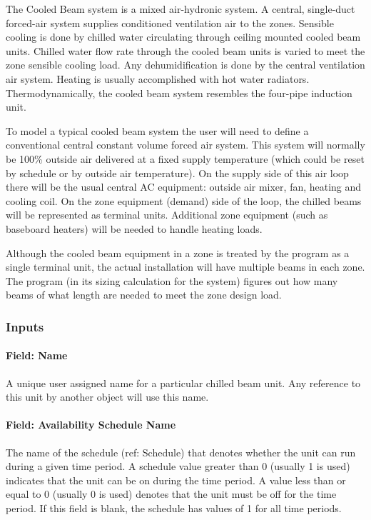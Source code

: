 The Cooled Beam system is a mixed air-hydronic system. A central, single-duct forced-air system supplies conditioned ventilation air to the zones. Sensible cooling is done by chilled water circulating through ceiling mounted cooled beam units. Chilled water flow rate through the cooled beam units is varied to meet the zone sensible cooling load. Any dehumidification is done by the central ventilation air system. Heating is usually accomplished with hot water radiators. Thermodynamically, the cooled beam system resembles the four-pipe induction unit.

To model a typical cooled beam system the user will need to define a conventional central constant volume forced air system. This system will normally be 100\% outside air delivered at a fixed supply temperature (which could be reset by schedule or by outside air temperature). On the supply side of this air loop there will be the usual central AC equipment: outside air mixer, fan, heating and cooling coil. On the zone equipment (demand) side of the loop, the chilled beams will be represented as terminal units. Additional zone equipment (such as baseboard heaters) will be needed to handle heating loads.

Although the cooled beam equipment in a zone is treated by the program as a single terminal unit, the actual installation will have multiple beams in each zone. The program (in its sizing calculation for the system) figures out how many beams of what length are needed to meet the zone design load.

\subsubsection{Inputs}\label{inputs-11-000}

\paragraph{Field: Name}\label{field-name-11-000}

A unique user assigned name for a particular chilled beam unit. Any reference to this unit by another object will use this name.

\paragraph{Field: Availability Schedule Name}\label{field-availability-schedule-name-10}

The name of the schedule (ref: Schedule) that denotes whether the unit can run during a given time period. A schedule value greater than 0 (usually 1 is used) indicates that the unit can be on during the time period. A value less than or equal to 0 (usually 0 is used) denotes that the unit must be off for the time period. If this field is blank, the schedule has values of 1 for all time periods.


